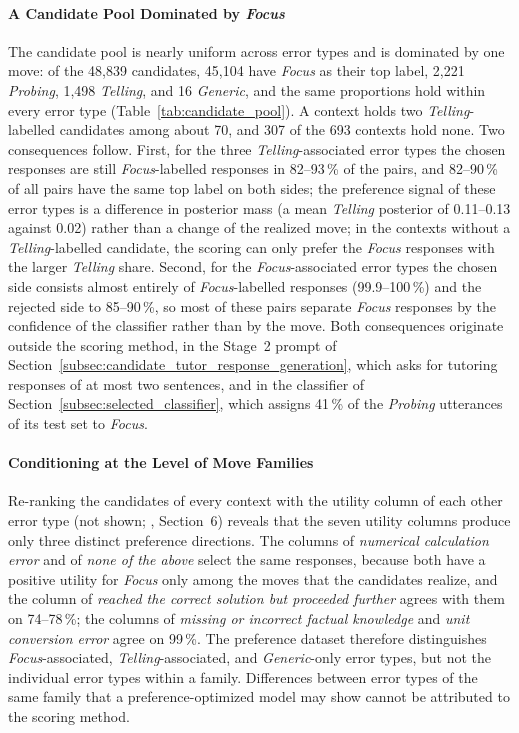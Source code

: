     \paragraph{A Candidate Pool Dominated by \textit{Focus}}
    The candidate pool is nearly uniform across error types and is dominated by one move: of the 48,839 candidates, 45,104 have \textit{Focus} as their top label, 2,221 \textit{Probing}, 1,498 \textit{Telling}, and 16 \textit{Generic}, and the same proportions hold within every error type (Table~\ref{tab:candidate_pool}). A context holds two \textit{Telling}-labelled candidates among about 70, and 307 of the 693 contexts hold none. Two consequences follow. First, for the three \textit{Telling}-associated error types the chosen responses are still \textit{Focus}-labelled responses in 82--93\,\% of the pairs, and 82--90\,\% of all pairs have the same top label on both sides; the preference signal of these error types is a difference in posterior mass (a mean \textit{Telling} posterior of 0.11--0.13 against 0.02) rather than a change of the realized move; in the contexts without a \textit{Telling}-labelled candidate, the scoring can only prefer the \textit{Focus} responses with the larger \textit{Telling} share. Second, for the \textit{Focus}-associated error types the chosen side consists almost entirely of \textit{Focus}-labelled responses (99.9--100\,\%) and the rejected side to 85--90\,\%, so most of these pairs separate \textit{Focus} responses by the confidence of the classifier rather than by the move. Both consequences originate outside the scoring method, in the Stage~2 prompt of Section~\ref{subsec:candidate_tutor_response_generation}, which asks for tutoring responses of at most two sentences, and in the classifier of Section~\ref{subsec:selected_classifier}, which assigns 41\,\% of the \textit{Probing} utterances of its test set to \textit{Focus}.

    \paragraph{Conditioning at the Level of Move Families}
    Re-ranking the candidates of every context with the utility column of each other error type (not shown; , Section~6) reveals that the seven utility columns produce only three distinct preference directions. The columns of \textit{numerical calculation error} and of \textit{none of the above} select the same responses, because both have a positive utility for \textit{Focus} only among the moves that the candidates realize, and the column of \textit{reached the correct solution but proceeded further} agrees with them on 74--78\,\%; the columns of \textit{missing or incorrect factual knowledge} and \textit{unit conversion error} agree on 99\,\%. The preference dataset therefore distinguishes \textit{Focus}-associated, \textit{Telling}-associated, and \textit{Generic}-only error types, but not the individual error types within a family. Differences between error types of the same family that a preference-optimized model may show cannot be attributed to the scoring method.

